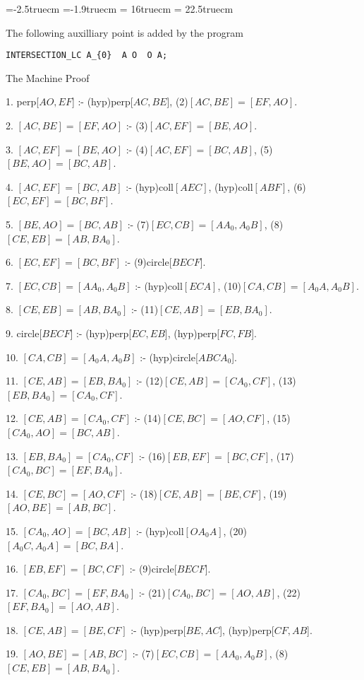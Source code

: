 \voffset=-2.5truecm
\hoffset=-1.9truecm
\textwidth = 16truecm
\textheight = 22.5truecm
\parskip=8pt
\parindent=15pt
\def\fa#1#2{\langle{#1},{#2}\rangle}

The following auxilliary point is added by the program

\begin{verbatim}
INTERSECTION_LC A_{0}  A O  O A;
\end{verbatim}


{\vskip6pt \parskip=6pt \parindent=10pt 
The Machine Proof


1. perp[$AO,EF$] :- (hyp)perp[$AC,BE$], (2)$[AC,BE]=[EF,AO]$.

2. $[AC,BE]=[EF,AO]$ :- (3)$[AC,EF]=[BE,AO]$.

3. $[AC,EF]=[BE,AO]$ :- (4)$[AC,EF]=[BC,AB]$, (5)$[BE,AO]=[BC,AB]$.

4. $[AC,EF]=[BC,AB]$ :- (hyp)coll$[AEC]$, (hyp)coll$[ABF]$, (6)$[EC,EF]=[BC,BF]$.

5. $[BE,AO]=[BC,AB]$ :- (7)$[EC,CB]=[AA_{0},A_{0}B]$, (8)$[CE,EB]=[AB,BA_{0}]$.

6. $[EC,EF]=[BC,BF]$ :- (9)circle[$BECF$].

7. $[EC,CB]=[AA_{0},A_{0}B]$ :- (hyp)coll$[ECA]$, (10)$[CA,CB]=[A_{0}A,A_{0}B]$.

8. $[CE,EB]=[AB,BA_{0}]$ :- (11)$[CE,AB]=[EB,BA_{0}]$.

9. circle[$BECF$] :- (hyp)perp[$EC,EB$], (hyp)perp[$FC,FB$].

10. $[CA,CB]=[A_{0}A,A_{0}B]$ :- (hyp)circle[$ABCA_{0}$].

11. $[CE,AB]=[EB,BA_{0}]$ :- (12)$[CE,AB]=[CA_{0},CF]$, (13)$[EB,BA_{0}]=[CA_{0},CF]$.

12. $[CE,AB]=[CA_{0},CF]$ :- (14)$[CE,BC]=[AO,CF]$, (15)$[CA_{0},AO]=[BC,AB]$.

13. $[EB,BA_{0}]=[CA_{0},CF]$ :- (16)$[EB,EF]=[BC,CF]$, (17)$[CA_{0},BC]=[EF,BA_{0}]$.

14. $[CE,BC]=[AO,CF]$ :- (18)$[CE,AB]=[BE,CF]$, (19)$[AO,BE]=[AB,BC]$.

15. $[CA_{0},AO]=[BC,AB]$ :- (hyp)coll$[OA_{0}A]$, (20)$[A_{0}C,A_{0}A]=[BC,BA]$.

16. $[EB,EF]=[BC,CF]$ :- (9)circle[$BECF$].

17. $[CA_{0},BC]=[EF,BA_{0}]$ :- (21)$[CA_{0},BC]=[AO,AB]$, (22)$[EF,BA_{0}]=[AO,AB]$.

18. $[CE,AB]=[BE,CF]$ :- (hyp)perp[$BE,AC$], (hyp)perp[$CF,AB$].

19. $[AO,BE]=[AB,BC]$ :- (7)$[EC,CB]=[AA_{0},A_{0}B]$, (8)$[CE,EB]=[AB,BA_{0}]$.

}
